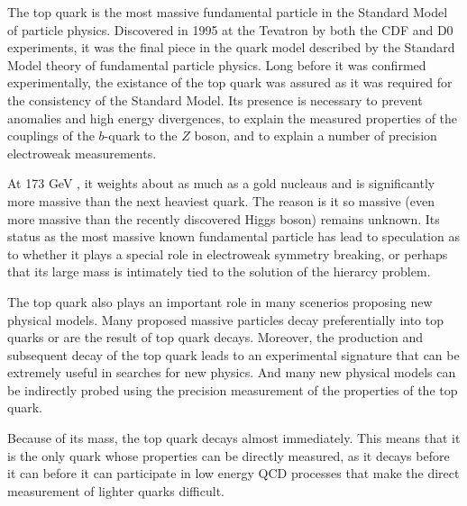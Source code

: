 
%




The top quark is the most massive fundamental particle in the Standard Model of particle physics.
Discovered in 1995 at the Tevatron by both the CDF and D0 experiments, it was the final piece in the quark model described by the Standard Model theory of fundamental particle physics.
Long before it was confirmed experimentally, the existance of the top quark was assured as it was required for the consistency of the Standard Model.
Its presence is necessary to prevent anomalies and high energy divergences, to explain the measured properties of the couplings of the $b$-quark to the $Z$ boson, and to explain a number of precision electroweak measurements.

At 173 GeV \cite{PARTICLE_DATA_GROUP}, it weights about as much as a gold nucleaus and is significantly more massive than the next heaviest quark.
The reason is it so massive (even more massive than the recently discovered Higgs boson) remains unknown.
Its status as the most massive known fundamental particle has lead to speculation as to whether it plays a special role in electroweak symmetry breaking, or perhaps that its large mass is intimately tied to the solution of the hierarcy problem.

The top quark also plays an important role in many scenerios proposing new physical models.
Many proposed massive particles decay preferentially into top quarks or are the result of top quark decays.
Moreover, the production and subsequent decay of the top quark leads to an experimental signature that can be extremely useful in searches for new physics.
And many new physical models can be indirectly probed using the precision measurement of the properties of the top quark.

Because of its mass, the top quark decays almost immediately.
This means that it is the only quark whose properties can be directly measured, as it decays before it can before it can participate in low energy QCD processes that make the direct measurement of lighter quarks difficult.

